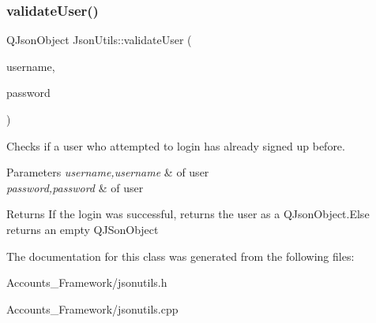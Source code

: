 \subsubsection{\texorpdfstring{validate\+User()}{validateUser()}}
{\footnotesize\ttfamily Q\+Json\+Object Json\+Utils\+::validate\+User (\begin{DoxyParamCaption}\item[{Q\+String \&}]{username,  }\item[{Q\+String \&}]{password }\end{DoxyParamCaption})}



Checks if a user who attempted to login has already signed up before. 


\begin{DoxyParams}{Parameters}
{\em username,username} & of user \\
\hline
{\em password,password} & of user \\
\hline
\end{DoxyParams}
\begin{DoxyReturn}{Returns}
If the login was successful, returns the user as a Q\+Json\+Object.\+Else returns an empty Q\+J\+Son\+Object 
\end{DoxyReturn}


The documentation for this class was generated from the following files\+:\begin{DoxyCompactItemize}
\item 
Accounts\+\_\+\+Framework/jsonutils.\+h\item 
Accounts\+\_\+\+Framework/jsonutils.\+cpp\end{DoxyCompactItemize}
